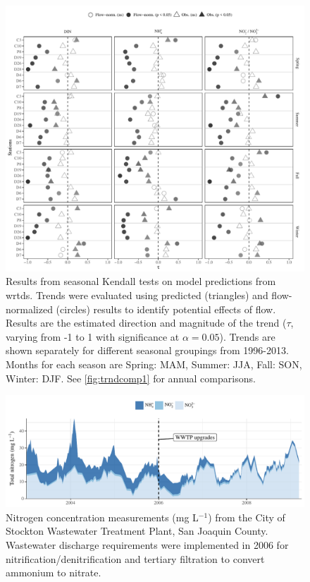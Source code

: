 \documentclass[journal = esthag, manuscript = article]{achemso}\usepackage[]{graphicx}\usepackage[]{color}
\begin{document}
\begin{suppinfo}
\begin{figure}
\centering
\includegraphics[width=1\textwidth,page=1]{figs/trndcomp3.pdf}
\caption{Results from seasonal Kendall tests on model predictions from \ac{wrtds}. Trends were evaluated using predicted (triangles) and flow-normalized (circles) results to identify potential effects of flow. Results are the estimated direction and magnitude of the trend ($\tau$, varying from -1 to 1 with significance at $\alpha = 0.05$). Trends are shown separately for different seasonal groupings from 1996-2013. Months for each season are Spring: MAM, Summer: JJA, Fall: SON, Winter: DJF. See \cref{fig:trndcomp1} for annual comparisons.}
\label{fig:trndcomp3}   
\end{figure}

\begin{figure}[!ht]

{\centering \includegraphics[width=\textwidth]{figs/stock-1} 

}

\caption[Nitrogen concentration measurements (mg L$^{-1}$) from the City of Stockton Wastewater Treatment Plant, San Joaquin County]{Nitrogen concentration measurements (mg L$^{-1}$) from the City of Stockton Wastewater Treatment Plant, San Joaquin County.  Wastewater discharge requirements were implemented in 2006 for nitrification/denitrification and tertiary filtration to convert ammonium to nitrate.}\label{fig:stock}
\end{figure}



\end{suppinfo}
\end{document}

